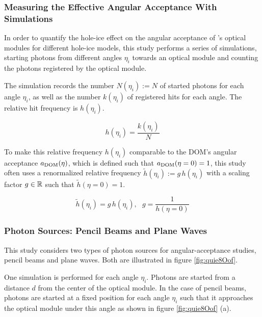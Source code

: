 \newpage

\subsubsection{Measuring the Effective Angular Acceptance With Simulations}
\label{sec:measuring_angular_acceptance_with_simulations}

\label{sec:gauging}

In order to quantify the hole-ice effect on the angular acceptance of
\icecube's optical modules for different hole-ice models, this study
performs a series of simulations, starting photons from different angles
\(\eta_i\) towards an optical module and counting the photons registered
by the optical module.

The simulation records the number \(N(\eta_i):= N\) of started photons
for each angle \(\eta_i\), as well as the number \(k(\eta_i)\) of
registered hits for each angle. The relative hit frequency is
\(h(\eta_i)\).

\begin{equation}
  h(\eta_i) = \frac{k(\eta_i)}{N}
\end{equation}

To make this relative frequency \(h(\eta_i)\) comparable to the DOM's
angular acceptance \(a_\text{DOM}(\eta)\), which is defined such that
\(a_\text{DOM}(\eta = 0) = 1\), this study often uses a renormalized relative
frequency \(\tilde{h}(\eta_i):=g\,h(\eta_i)\) with a scaling factor
\(g\in\mathbb{R}\) such that \(\tilde{h}(\eta = 0) = 1\).

\begin{equation}
  \tilde{h}(\eta_i) = g\,h(\eta_i), \ \ \
  g = \frac{1}{h(\eta = 0)}
  \label{eq:gauging_factor}
\end{equation}


\newpage

\subsubsection{Photon Sources: Pencil Beams and Plane Waves}

This study considers two types of photon sources for angular-acceptance
studies, pencil beams and plane waves. Both are illustrated in figure
\ref{fig:quie8Oof}.

One simulation is performed for each angle \(\eta_i\). Photons are
started from a distance \(d\) from the center of the optical module. In
the case of pencil beams, photons are started at a fixed position for
each angle \(\eta_i\) such that it approaches the optical module under
this angle as shown in figure \ref{fig:quie8Oof} (a).

